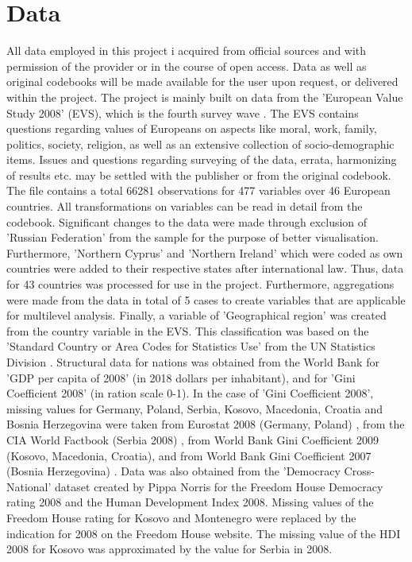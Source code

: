 \documentclass[preprint,12pt,authoryear]{elsarticle}
\begin{document}
	\section{Data}
	All data employed in this project i acquired from official sources and with permission of the provider or in the course of open access. Data as well as original codebooks will be made available for the user upon request, or delivered within the project.
	The project is mainly built on data from the 'European Value Study 2008' (EVS), which is the fourth survey wave \citep{evs_european_2016}. The EVS contains questions regarding values of Europeans on aspects like moral, work, family, politics, society, religion, as well as an extensive collection of socio-demographic items. Issues and questions regarding surveying of the data, errata, harmonizing of results etc. may be settled with the publisher or from the original codebook. The file contains a total 66281 observations for 477 variables over 46 European countries. All transformations on variables can be read in detail from the codebook. Significant changes to the data were made through exclusion of 'Russian Federation' from the sample for the purpose of better visualisation. Furthermore, 'Northern Cyprus' and 'Northern Ireland' which were coded as own countries were added to their respective states after international law. Thus, data for 43 countries was processed for use in the project. Furthermore, aggregations were made from the data in total of 5 cases to create variables that are applicable for multilevel analysis. Finally, a variable of 'Geographical region' was created from the country variable in the EVS. This classification was based on the 'Standard Country or Area Codes for Statistics Use' from the UN Statistics Division \citep{unsd_standard_2019}.
	Structural data for nations was obtained from the World Bank for 'GDP per capita of 2008' (in 2018 dollars per inhabitant)\citep{world_bank_gdp_2019}, and for 'Gini Coefficient 2008' (in ration scale 0-1)\citep{world_bank_gini_2019}. In the case of 'Gini Coefficient 2008', missing values for Germany, Poland, Serbia, Kosovo, Macedonia, Croatia and Bosnia Herzegovina were taken from Eurostat 2008 (Germany, Poland) \citep{eurostat_eurostat_2019}, from the CIA World Factbook (Serbia 2008) \citep{central_intelligence_agency_serbia_2019}, from World Bank Gini Coefficient 2009 (Kosovo, Macedonia, Croatia), and from World Bank Gini Coefficient 2007 (Bosnia Herzegovina) \citep{world_bank_gini_2019}. Data was also obtained from the 'Democracy Cross-National' dataset created by Pippa Norris \citep{norris_data_2015} for the Freedom House Democracy rating 2008 and the Human Development Index 2008. Missing values of the Freedom House rating for Kosovo \citep{freedom_house_kosovo_2012} and Montenegro \citep{freedom_house_montenegro_2012} were replaced by the indication for 2008 on the Freedom House website. The missing value of the HDI 2008 for Kosovo was approximated by the value for Serbia in 2008.
	
\end{document}
